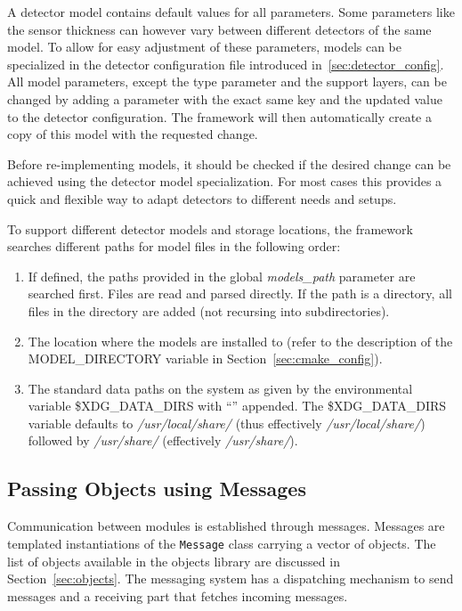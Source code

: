 A detector model contains default values for all parameters.
Some parameters like the sensor thickness can however vary between different detectors of the same model.
To allow for easy adjustment of these parameters, models can be specialized in the detector configuration file introduced in~\ref{sec:detector_config}.
All model parameters, except the type parameter and the support layers, can be changed by adding a parameter with the exact same key and the updated value to the detector configuration.
The framework will then automatically create a copy of this model with the requested change.

\begin{warning}
Before re-implementing models, it should be checked if the desired change can be achieved using the detector model specialization. For most cases this provides a quick and flexible way to adapt detectors to different needs and setups.
\end{warning}

To support different detector models and storage locations, the framework searches different paths for model files in the following order:
\begin{enumerate}
\item If defined, the paths provided in the global \textit{models\_path} parameter are searched first.
Files are read and parsed directly.
If the path is a directory, all files in the directory are added (not recursing into subdirectories).
\item The location where the models are installed to (refer to the description of the MODEL\_DIRECTORY variable in Section~\ref{sec:cmake_config}).
\item The standard data paths on the system as given by the environmental variable \$XDG\_DATA\_DIRS with ``\project'' appended.
The \$XDG\_DATA\_DIRS variable defaults to \textit{/usr/local/share/} (thus effectively \textit{/usr/local/share/\project}) followed by \textit{/usr/share/} (effectively \textit{/usr/share/\project}).
\end{enumerate}

\subsection{Passing Objects using Messages}
\label{sec:objects_messages}
Communication between modules is established through messages.
Messages are templated instantiations of the \texttt{Message} class carrying a vector of objects.
The list of objects available in the \apsq objects library are discussed in Section~\ref{sec:objects}.
The messaging system has a dispatching mechanism to send messages and a receiving part that fetches incoming messages.

